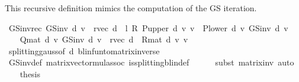 \begin{isabellebody}
\isamarkupfalse%
%
\endisatagproof
{\isafoldproof}%
%
\isadelimproof
%
\endisadelimproof
%
\begin{isamarkuptext}%
This recursive definition mimics the computation of the GS iteration.%
\end{isamarkuptext}\isamarkuptrue%
\isamarkupfalse%
\ GS{\isacharunderscore}{\kern0pt}inv{\isacharunderscore}{\kern0pt}rec{\isacharcolon}{\kern0pt}\ {\isachardoublequoteopen}GS{\isacharunderscore}{\kern0pt}inv\ d\ v\ {\isacharequal}{\kern0pt}\ r{\isacharunderscore}{\kern0pt}vec\ d\ {\isacharplus}{\kern0pt}\ l\ {\isacharasterisk}{\kern0pt}\isactrlsub R\ {\isacharparenleft}{\kern0pt}P{\isacharunderscore}{\kern0pt}upper\ d\ {\isacharasterisk}{\kern0pt}v\ v\ {\isacharplus}{\kern0pt}\ P{\isacharunderscore}{\kern0pt}lower\ d\ {\isacharasterisk}{\kern0pt}v\ {\isacharparenleft}{\kern0pt}GS{\isacharunderscore}{\kern0pt}inv\ d\ v{\isacharparenright}{\kern0pt}{\isacharparenright}{\kern0pt}{\isachardoublequoteclose}\isanewline
%
\isadelimproof
%
\endisadelimproof
%
\isatagproof
{}\isamarkupfalse%
\ {\isacharminus}{\kern0pt}\isanewline
\ \ \isamarkupfalse%
\ {\isachardoublequoteopen}Q{\isacharunderscore}{\kern0pt}mat\ d\ {\isacharasterisk}{\kern0pt}v\ {\isacharparenleft}{\kern0pt}GS{\isacharunderscore}{\kern0pt}inv\ d\ v{\isacharparenright}{\kern0pt}\ {\isacharequal}{\kern0pt}\ r{\isacharunderscore}{\kern0pt}vec\ d\ {\isacharplus}{\kern0pt}\ R{\isacharunderscore}{\kern0pt}mat\ d\ {\isacharasterisk}{\kern0pt}v\ v{\isachardoublequoteclose}\isanewline
\ \ \ \ \isamarkupfalse%
\ splitting{\isacharunderscore}{\kern0pt}gauss{\isacharbrackleft}{\kern0pt}of\ d{\isacharbrackright}{\kern0pt}\ blinfun{\isacharunderscore}{\kern0pt}to{\isacharunderscore}{\kern0pt}matrix{\isacharunderscore}{\kern0pt}inverse{\isacharparenleft}{\kern0pt}{}{\isacharparenright}{\kern0pt}\isanewline
\ \ \ \ \isamarkupfalse%
\ GS{\isacharunderscore}{\kern0pt}inv{\isacharunderscore}{\kern0pt}def\ matrix{\isacharunderscore}{\kern0pt}vector{\isacharunderscore}{\kern0pt}mul{\isacharunderscore}{\kern0pt}assoc\ is{\isacharunderscore}{\kern0pt}splitting{\isacharunderscore}{\kern0pt}blin{\isacharunderscore}{\kern0pt}def{\isacharprime}{\kern0pt}\isanewline
\ \ \ \ \isamarkupfalse%
\ {\isacharparenleft}{\kern0pt}subst\ matrix{\isacharunderscore}{\kern0pt}inv{\isacharparenleft}{\kern0pt}{}{\isacharparenright}{\kern0pt}{\isacharparenright}{\kern0pt}\ auto\isanewline
\ \ \isamarkupfalse%
\ {\isacharquery}{\kern0pt}thesis\ \isanewline

\end{isabellebody}
